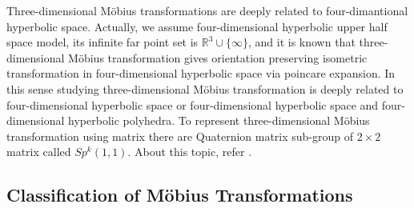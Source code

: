 Three-dimensional M\"obius transformations are deeply related to
four-dimantional hyperbolic space. Actually, we assume four-dimensional
hyperbolic upper half space model, its infinite far point set is
$\mathbb{R}^3\cup\{\infty\}$, and it is known that three-dimensional M\"obius
transformation gives orientation preserving isometric transformation in
four-dimensional hyperbolic space via poincare expansion.
In this sense studying three-dimensional M\"obius transformation is
deeply related to four-dimensional hyperbolic space or four-dimensional
hyperbolic space and four-dimensional hyperbolic polyhedra.
To represent three-dimensional M\"obius transformation using matrix
there are Quaternion matrix sub-group of $2 \times 2$ matrix called
$Sp^k(1,1)$. About this topic, refer
\cite{sakugawa2010limit}\cite{sakugawa2007master}.

\subsection{Classification of M\"obius Transformations}

